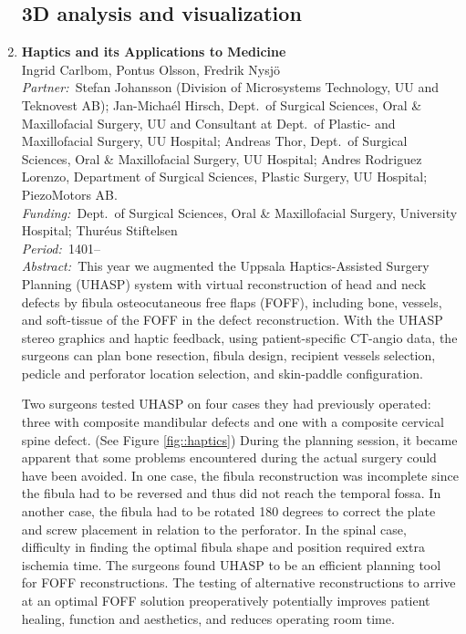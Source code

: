 \documentclass[10pt, a4paper]{article}
\newcommand{\aabstract}[1]{\emph{Abstract:~}#1}
\newcommand{\ffunding}[1]{\emph{Funding:~}#1\\}
\newcommand{\ppartner}[1]{\emph{Partner:~}#1\\}
\newcommand{\pperiod}[1]{\emph{Period:~}#1\\}
\begin{document}
\begin{enumerate}
\clearpage


\subsection{3D analysis and visualization}


\item 
\label{proj:CMS}
\textbf{Haptics and its Applications to Medicine}\\
Ingrid Carlbom, Pontus Olsson, Fredrik Nysj\"{o}\\
\ppartner{Stefan Johansson (Division of Microsystems Technology, UU and Teknovest AB); Jan-Micha{\'e}l Hirsch, Dept.~of Surgical Sciences, Oral \& Maxillofacial Surgery, UU and Consultant at Dept.~of Plastic- and Maxillofacial Surgery, UU Hospital; Andreas Thor, Dept.~of Surgical Sciences, Oral \& Maxillofacial Surgery, UU Hospital; Andres Rodriguez Lorenzo, Department of Surgical Sciences, Plastic Surgery, UU Hospital; PiezoMotors AB.}
\ffunding{Dept.~of Surgical Sciences, Oral \& Maxillofacial Surgery, University Hospital; Thur\' eus Stiftelsen}
\pperiod{1401--}
\aabstract{This year we augmented the Uppsala Haptics-Assisted Surgery Planning (UHASP) system with virtual reconstruction of head and neck defects by fibula osteocutaneous free flaps (FOFF), including bone, vessels, and soft-tissue of the FOFF in the defect reconstruction. With the UHASP stereo graphics and haptic feedback, using patient-specific CT-angio data, the surgeons can plan bone resection, fibula design, recipient vessels selection, pedicle and perforator location selection, and skin-paddle configuration.

Two surgeons tested UHASP on four cases they had previously operated: three with composite mandibular defects and one with a composite cervical spine defect. (See Figure \ref{fig::haptics}) During the planning session, it became apparent that some problems encountered during the actual surgery could have been avoided. In one case, the fibula reconstruction was incomplete since the fibula had to be reversed and thus did not reach the temporal fossa. In another case, the fibula had to be rotated 180 degrees to correct the plate and screw placement in relation to the perforator. In the spinal case, difficulty in finding the optimal fibula shape and position required extra ischemia time. The surgeons found UHASP to be an efficient planning tool for FOFF reconstructions. The testing of alternative reconstructions to arrive at an optimal FOFF solution preoperatively potentially improves patient healing, function and aesthetics, and reduces operating room time.}


\end{enumerate}
\end{document}
